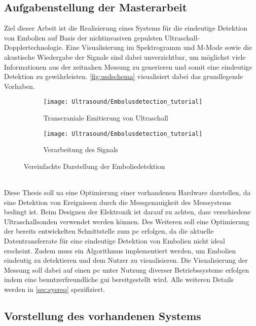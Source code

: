 \subsection{Aufgabenstellung der Masterarbeit}
Ziel dieser Arbeit ist die Realisierung eines Systems für die eindeutige Detektion von Embolien auf Basis der nichtinvasiven gepulsten Ultraschall-Dopplertechnologie. Eine Visualisierung im Spektrogramm und M-Mode sowie die akustische Wiedergabe der Signale sind dabei unverzichtbar, um möglichst viele Informationen aus der zeitnahen Messung zu generieren und somit eine eindeutige Detektion zu gewährleisten. \autoref{fig:usdschema} visualisiert dabei das grundlegende Vorhaben.
\begin{figure}[h!]
	\centering
	\begin{subfigure}[b]{0.47\textwidth}
		\centering
  		\texttt{[image: Ultrasound/Embolusdetection\_tutorial]}  
		\caption{Transcraniale Emitierung von Ultraschall}
  	\end{subfigure}
  	\hfill
  	\begin{subfigure}[b]{0.47\textwidth}
	  	\centering
  		\texttt{[image: Ultrasound/Embolusdetection\_tutorial]}
	  	\caption{Verarbeitung des Signals}
  	\end{subfigure}
	\caption[Vereinfachte Darstellung der Emboliedetektion]{Vereinfachte Darstellung der Emboliedetektion\cite[p. 2]{emboli}}
  	\label{fig:usdschema}
\end{figure}\\
Diese Thesis soll \ac{ua} eine Optimierung einer vorhandenen Hardware darstellen, da eine Detektion von Ereignissen durch die Messgenauigkeit des Messsystems bedingt ist. Beim Designen der Elektronik ist darauf zu achten, dass verschiedene Ultraschallsonden verwendet werden können. Des Weiteren soll eine Optimierung der bereits entwickelten Schnittstelle zum \ac{pc} erfolgen, da die aktuelle Datentransferrate für eine eindeutige Detektion von Embolien nicht ideal erscheint. Zudem muss ein Algorithmus implementiert werden, um Embolien eindeutig zu detektieren und dem Nutzer zu visualisieren. Die Visualisierung der Messung soll dabei auf einen \ac{pc} unter Nutzung diverser Betriebssysteme erfolgen indem eine benutzerfreundliche \ac{gui} bereitgestellt wird. Alle weiteren Details werden in \autoref{sec:sysreq} spezifiziert.

\subsection{Vorstellung des vorhandenen Systems}
